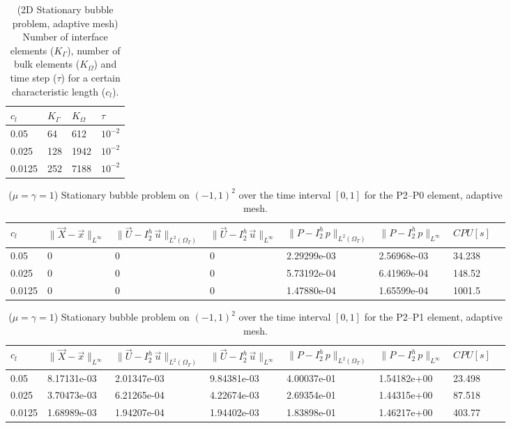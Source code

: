 \documentclass[a4paper,12pt,onecolumn]{article}
\newcommand{\errorXx}{\|\vec{X} - \vec{x}\|_{L^\infty}}
\newcommand{\LerrorUu}[1]{\|\vec U - I^h_{#1}\,\vec u\|_{L^2(\Omega_T)}}
\newcommand{\errorUu}[1]{\|\vec U - I^h_{#1}\,\vec u\|_{L^\infty}}
\newcommand{\errorPp}[1]{\|P - I^h_{#1}\,p\|_{L^\infty}}
\newcommand{\LerrorPp}[1]{\|P - I^h_{#1}\,p\|_{L^2(\Omega_T)}}
\begin{document}
\begin{table}
 \center
\begin{tabular}{llll}
\hline
$c_l$ & $K_\Gamma$ & $K_\Omega$ & $\tau$ \\
\hline
0.05 & 64 &  612 & $10^{-2}$\\
0.025 & 128 & 1942 & $10^{-2}$ \\
0.0125 & 252 & 7188 & $10^{-2}$ \\
\hline
\end{tabular}
\caption{(2D Stationary bubble problem, adaptive mesh) Number of interface elements ($K_\Gamma$), number of bulk elements ($K_\Omega$) and time step ($\tau$) for a certain characteristic length ($c_l$).}
\label{tab:bubble2Delementsadaptive}
\end{table}

\begin{table}
 \center
 \hspace*{-2cm}
\begin{tabular}{llllllll}
\hline
$c_l$ & $\errorXx$ & $\LerrorUu2$ & $\errorUu2$ & $\LerrorPp2$ & $\errorPp2$ & $CPU[s]$ \\
\hline
0.05 & 0 & 0 & 0 & 2.29299e-03 & 2.56968e-03 & 34.238\\
0.025 & 0 & 0 & 0 & 5.73192e-04 & 6.41969e-04 & 148.52\\
0.0125 & 0 & 0 & 0& 1.47880e-04 & 1.65599e-04 & 1001.5\\
\hline
\end{tabular}
\hspace*{-2cm}
\caption{($\mu=\gamma=1$) Stationary bubble problem on $(-1,1)^2$ over the time interval $[0,1]$ for the P2--P0 element, adaptive mesh.}
\label{tab:bubble2Dp2p0adaptive}
\end{table}

\begin{table}
 \center
 \hspace*{-2cm}
\begin{tabular}{llllllll}
\hline
$c_l$ & $\errorXx$ & $\LerrorUu2$ & $\errorUu2$ & $\LerrorPp2$ & $\errorPp2$ & $CPU[s]$ \\
\hline
0.05 & 8.17131e-03 & 2.01347e-03 & 9.84381e-03 & 4.00037e-01 & 1.54182e+00 & 23.498\\
0.025 & 3.70473e-03 & 6.21265e-04 & 4.22674e-03 & 2.69354e-01 & 1.44315e+00 & 87.518\\
0.0125 & 1.68989e-03 & 1.94207e-04 & 1.94402e-03 & 1.83898e-01 & 1.46217e+00 & 403.77\\
\hline
\end{tabular}
\hspace*{-2cm}
\caption{($\mu=\gamma=1$) Stationary bubble problem on $(-1,1)^2$ over the time interval $[0,1]$ for the P2--P1 element, adaptive mesh.}
\label{tab:bubble2Dp2p1adaptive}
\end{table}
\end{document}
